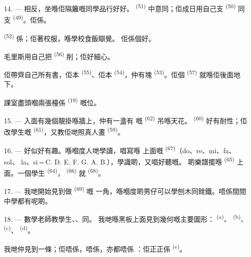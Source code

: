 14. --- 相反，坐喺佢隔籬嘅同學品行好好。 \textsuperscript{(51)}
中意同；佢成日用自己支
\textsuperscript{(50)} 同支 \textsuperscript{(49)}。佢係。

 \textsuperscript{(52)} 係；佢著校服，喺學校食飯瞓覺。
佢係個好。

毛里斯用自己把 \textsuperscript{(56)} 削；佢好細心。

佢帶齊自己所有書，佢本 \textsuperscript{(55)}、佢本
\textsuperscript{(54)}，仲有塊 \textsuperscript{(53)}。佢個
 \textsuperscript{(57)} 就喺佢後面地下。

課室盡頭嗰兩張檯係 \textsuperscript{(19)} 嘅位。

\VUsaut{4.6mm}
\VUsaut{3.4mm}

15. --- 入面有幾個靚掛喺牆上，仲有一盞有
嘅 \textsuperscript{(62)} 吊喺天花。 \textsuperscript{(60)}
好有耐性；佢改學生嘅 \textsuperscript{(61)}，又教佢哋照真人畫
 \textsuperscript{(59)}。

16. --- 好似好有趣。喺嗰度人哋學讀，唱寫喺
上面嘅 \textsuperscript{(67)}（do、re、mi、fa、sol、
la、si\,=\,C. D. E. F. G. A. B.），學識啲，又唱好聽嘅。
啲樂譜擺喺 \textsuperscript{(65)} 上面。一個學生
\textsuperscript{(64)}， \textsuperscript{(66)} 就
\textsuperscript{(68)}。

17. --- 我哋開始見到做 \textsuperscript{(69)} 嘅
一角，喺嗰度啲男仔可以學刨木同銼鐵。唔係間間中學都有呢啲。

\VUsaut{5.0mm}
\VUsaut{3.6mm}

18. --- 數學老師教學生、、同。
我哋喺黑板上面見到幾何嘅主要圖形： \textsuperscript{(a)}、
 \textsuperscript{(b)}、 \textsuperscript{(c)}、
 \textsuperscript{(d)}。

我哋仲見到一條；佢唔係，唔係，亦都唔係
：佢正正係 \textsuperscript{(e)}。

